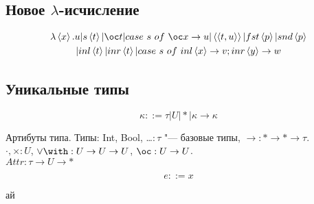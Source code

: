\subsection{\texorpdfstring{Новое $\lambda$-исчисление}{}}
\begin{gather*}
    \lambda
        \left<x\right>.u
        | s\left<t\right>
        | \oc t
        | case~s~of~\oc x \rightarrow u
        | \left<\left<t,u\right>\right> | fst\left<p\right> | snd \left<p\right> \\
        | inl \left<t\right> | inr \left<t\right> | case~s~of~inl\left<x\right> \rightarrow v; inr\left<y\right>\rightarrow w
\end{gather*}

\subsection{\texorpdfstring{Уникальные типы}{Unique types}}

\begin{bnf}
\[
    \kappa ::= \tau | U | * | \kappa \rightarrow \kappa
\]
\end{bnf}

Артибуты типа.
Типы: Int, Bool, \ldots $: \tau$ "--- базовые типы, $\rightarrow : * \rightarrow * \rightarrow \tau$. \\
$\cdot, \times : U$, $\vee \with : U \rightarrow U \rightarrow U$, $\oc : U \rightarrow U$. \\
$Attr : \tau \rightarrow U \rightarrow *$

\begin{bnf}
\[
    e ::= x
\]
\end{bnf}

ай
